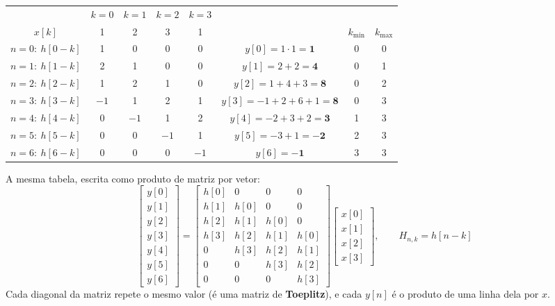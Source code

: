\documentclass[11pt,a4paper,oneside]{article}
\begin{document}
\begin{center}
\renewcommand{\arraystretch}{1.15}
\newcommand{\z}{\color{black!30}0}
\newcommand{\cor}[1]{\cellcolor{voce!15}#1}
\begin{tabular}{@{}c|cccc|c|cc@{}}
\toprule
 & \(k=0\) & \(k=1\) & \(k=2\) & \(k=3\) & & & \\
\(x[k]\) & 1 & 2 & 3 & 1 & & \(k_{\min}\) & \(k_{\max}\) \\
\midrule
\(n=0\colon\ h[0-k]\) & \cor{1} & \z & \z & \z & \(y[0]=1\cdot1=\mathbf{1}\) & 0 & 0 \\
\(n=1\colon\ h[1-k]\) & \cor{2} & \cor{1} & \z & \z & \(y[1]=2+2=\mathbf{4}\) & 0 & 1 \\
\(n=2\colon\ h[2-k]\) & \cor{1} & \cor{2} & \cor{1} & \z & \(y[2]=1+4+3=\mathbf{8}\) & 0 & 2 \\
\(n=3\colon\ h[3-k]\) & \cor{\(-1\)} & \cor{1} & \cor{2} & \cor{1} & \(y[3]=-1+2+6+1=\mathbf{8}\) & 0 & 3 \\
\(n=4\colon\ h[4-k]\) & \z & \cor{\(-1\)} & \cor{1} & \cor{2} & \(y[4]=-2+3+2=\mathbf{3}\) & 1 & 3 \\
\(n=5\colon\ h[5-k]\) & \z & \z & \cor{\(-1\)} & \cor{1} & \(y[5]=-3+1=\mathbf{-2}\) & 2 & 3 \\
\(n=6\colon\ h[6-k]\) & \z & \z & \z & \cor{\(-1\)} & \(y[6]=\mathbf{-1}\) & 3 & 3 \\
\bottomrule
\end{tabular}
\end{center}

A mesma tabela, escrita como produto de matriz por vetor:
\[
  \begin{bmatrix} y[0]\\ y[1]\\ y[2]\\ y[3]\\ y[4]\\ y[5]\\ y[6] \end{bmatrix}
  =
  \begin{bmatrix}
    h[0] & 0    & 0    & 0    \\
    h[1] & h[0] & 0    & 0    \\
    h[2] & h[1] & h[0] & 0    \\
    h[3] & h[2] & h[1] & h[0] \\
    0    & h[3] & h[2] & h[1] \\
    0    & 0    & h[3] & h[2] \\
    0    & 0    & 0    & h[3]
  \end{bmatrix}
  \begin{bmatrix} x[0]\\ x[1]\\ x[2]\\ x[3] \end{bmatrix},
  \qquad H_{n,k} = h[n-k]
\]
Cada diagonal da matriz repete o mesmo valor (é uma matriz de
\textbf{Toeplitz}), e cada \(y[n]\) é o produto de uma linha dela por \(x\).
\end{document}
